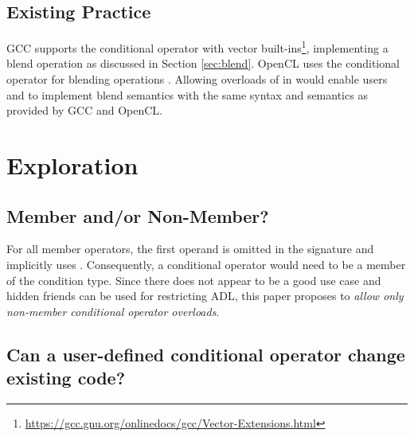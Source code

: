 \subsection{Existing Practice}
GCC supports the conditional operator with vector built-ins\footnote{\url{https://gcc.gnu.org/onlinedocs/gcc/Vector-Extensions.html}}, implementing a blend operation as discussed in Section \ref{sec:blend}.
OpenCL uses the conditional operator for blending operations \cite{spec.opencl1.1}.
Allowing overloads of  in \CC{} would enable users and  to implement blend semantics with the same syntax and semantics as provided by GCC and OpenCL.

\section{Exploration}


\subsection{Member and/or Non-Member?}

For all member operators, the first operand is omitted in the signature and implicitly uses .
Consequently, a conditional operator would need to be a member of the condition type.
Since there does not appear to be a good use case and hidden friends can be used for restricting ADL, this paper proposes to \emph{allow only non-member conditional operator overloads}.

\subsection{Can a user-defined conditional operator change existing code?}

